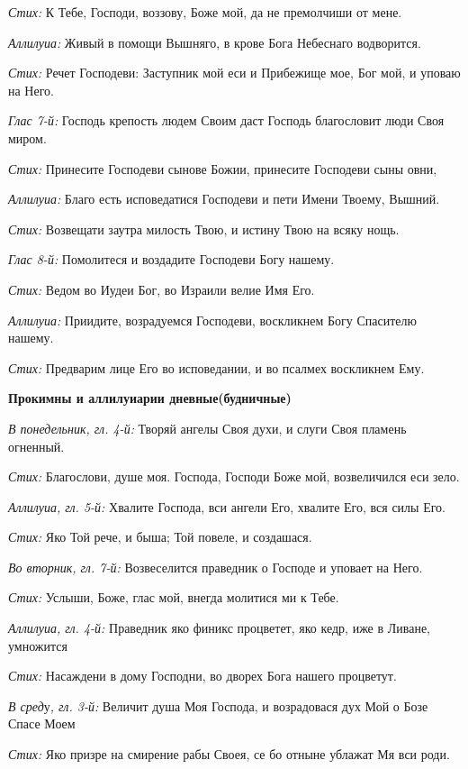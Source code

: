 {\itshape Стих:} К Тебе, Господи, воззову, Боже мой, да не премолчиши от мене.

{\itshape Аллилуиа:} Живый в помощи Вышняго, в крове Бога Небеснаго водворится.

{\itshape Стих:} Речет Господеви: Заступник мой еси и Прибежище мое, Бог мой, и уповаю на Него.

{\itshape Глас 7-й:} Господь крепость людем Своим даст Господь благословит люди Своя миром.

{\itshape Стих:} Принесите Господеви сынове Божии, принесите Господеви сыны овни,

{\itshape Аллилуиа:} Благо есть исповедатися Господеви и пети Имени Твоему, Вышний.

{\itshape Стих:} Возвещати заутра милость Твою, и истину Твою на всяку нощь.

{\itshape Глас 8-й:} Помолитеся и воздадите Господеви Богу нашему.

{\itshape Стих:} Ведом во Иудеи Бог, во Израили велие Имя Его.

{\itshape Аллилуиа:} Приидите, возрадуемся Господеви, воскликнем Богу Спасителю нашему.

{\itshape Стих:} Предварим лице Его во исповедании, и во псалмех воскликнем Ему.


{\bfseries Прокимны и аллилуиарии дневные(будничные)}

{\itshape В понедельник, гл. 4-й:} Творяй ангелы Своя духи, и слуги Своя пламень огненный.

{\itshape Стих:} Благослови, душе моя. Господа, Господи Боже мой, возвеличился еси зело.

{\itshape Аллилуиа, гл. 5-й:} Хвалите Господа, вси ангели Его, хвалите Его, вся силы Его.

{\itshape Стих:} Яко Той рече, и быша; Той повеле, и создашася.

{\itshape Во вторник, гл. 7-й:} Возвеселится праведник о Господе и уповает на Него.

{\itshape Стих:} Услыши, Боже, глас мой, внегда молитися ми к Тебе.

{\itshape Аллилуиа, гл. 4-й:} Праведник яко финикс процветет, яко кедр, иже в Ливане, умножится

{\itshape Стих:} Насаждени в дому Господни, во дворех Бога нашего процветут.

{\itshape В сред}у{\itshape , гл. 3-й:} Величит душа Моя Господа, и возрадовася дух Мой о Бозе Спасе Моем

{\itshape Стих:} Яко призре на смирение рабы Своея, се бо отныне ублажат Мя вси роди.

